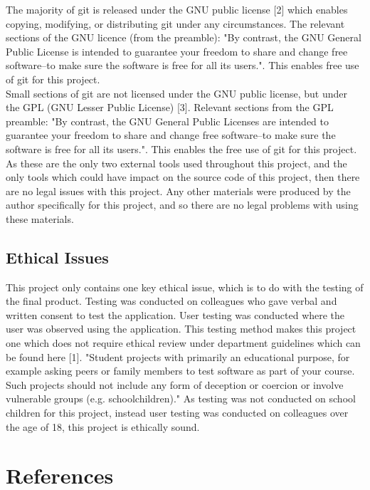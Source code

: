 \documentclass{article}
\begin{document}
The majority of git is released under the GNU public license [2] which enables copying, modifying, or distributing git under any circumstances. The relevant sections of the GNU licence (from the preamble): "By contrast, the GNU General Public License is intended to guarantee your freedom to share and change free software--to make sure the software is free for all its users.". This enables free use of git for this project. \\

Small sections of git are not licensed under the GNU public license, but under the GPL (GNU Lesser Public License) [3]. Relevant sections from the GPL preamble: "By contrast, the GNU General Public Licenses are intended to guarantee your freedom to share and change free software--to make sure the software is free for all its users.". This enables the free use of git for this project. \\

As these are the only two external tools used throughout this project, and the only tools which could have impact on the source code of this project, then there are no legal issues with this project. Any other materials were produced by the author specifically for this project, and so there are no legal problems with using these materials. \\

\subsection{Ethical Issues}

This project only contains one key ethical issue, which is to do with the testing of the final product. Testing was conducted on colleagues who gave verbal and written consent to test the application. User testing was conducted where the user was observed using the application. This testing method makes this project one which does not require ethical review under department guidelines which can be found here [1]. "Student projects with primarily an educational purpose, for example asking peers or family members to test software as part of your course. Such projects should not include any form of deception or coercion or involve vulnerable groups (e.g. schoolchildren)." As testing was not conducted on school children for this project, instead user testing was conducted on colleagues over the age of 18, this project is ethically sound. 

\section{References}
\label{section:references}
\end{document}
